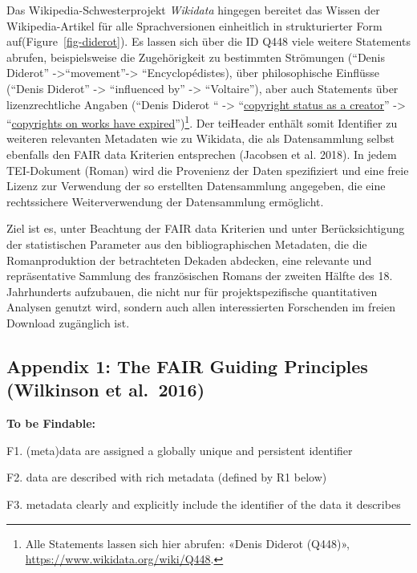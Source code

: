 \documentclass[
  12pt,
  letterpaper,
  DIV=11,
  numbers=noendperiod]{scrreprt}
\begin{document}
Das Wikipedia-Schwesterprojekt \emph{Wikidata} hingegen bereitet das
Wissen der Wikipedia-Artikel für alle Sprachversionen einheitlich in
strukturierter Form auf(Figure~\ref{fig-diderot}). Es lassen sich über
die ID Q448 viele weitere Statements abrufen, beispielsweise die
Zugehörigkeit zu bestimmten Strömungen (``Denis Diderot''
-\textgreater{}``movement''-\textgreater{} ``Encyclopédistes), über
philosophische Einflüsse (``Denis Diderot'' -\textgreater{} ``influenced
by'' -\textgreater{} ``Voltaire''), aber auch Statements über
lizenzrechtliche Angaben (``Denis Diderot `` -\textgreater{}
``\href{https://www.wikidata.org/wiki/Property:P7763}{copyright status
as a creator}'' -\textgreater{}
``\href{https://www.wikidata.org/wiki/Q71887839}{copyrights on works
have expired}'')\footnote{Alle Statements lassen sich hier abrufen:
  «Denis Diderot (Q448)», \url{https://www.wikidata.org/wiki/Q448}.}.
Der teiHeader enthält somit Identifier zu weiteren relevanten Metadaten
wie zu Wikidata, die als Datensammlung selbst ebenfalls den FAIR data
Kriterien entsprechen (Jacobsen et al. 2018). In jedem TEI-Dokument
(Roman) wird die Provenienz der Daten spezifiziert und eine freie Lizenz
zur Verwendung der so erstellten Datensammlung angegeben, die eine
rechtssichere Weiterverwendung der Datensammlung ermöglicht.

Ziel ist es, unter Beachtung der FAIR data Kriterien und unter
Berücksichtigung der statistischen Parameter aus den bibliographischen
Metadaten, die die Romanproduktion der betrachteten Dekaden abdecken,
eine relevante und repräsentative Sammlung des französischen Romans der
zweiten Hälfte des 18. Jahrhunderts aufzubauen, die nicht nur für
projektspezifische quantitativen Analysen genutzt wird, sondern auch
allen interessierten Forschenden im freien Download zugänglich ist.

\subsection{Appendix 1: The FAIR Guiding Principles (Wilkinson et
al.~2016)}\label{appendix-1-the-fair-guiding-principles-wilkinson-et-al.-2016}

\textbf{To be Findable:}

F1. (meta)data are assigned a globally unique and persistent identifier

F2. data are described with rich metadata (defined by R1 below)

F3. metadata clearly and explicitly include the identifier of the data
it describes
\end{document}
